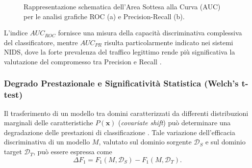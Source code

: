 \begin{figure}[H]
    \caption{Rappresentazione schematica dell'Area Sottesa alla Curva (AUC) per le analisi grafiche ROC (a) e Precision-Recall (b).}
    \label{fig:curve_roc_pr}
\end{figure}

L'indice $AUC_{ROC}$ fornisce una misura della capacità discriminativa complessiva del classificatore, mentre $AUC_{PR}$ risulta particolarmente indicato nei sistemi NIDS, dove la forte prevalenza del traffico legittimo rende più significativa la valutazione del compromesso tra Precision e Recall \cite{saito2015}.

\subsubsection{Degrado Prestazionale e Significatività Statistica (Welch's t-test)}
\label{subsubsec:significativita_statistica}

Il trasferimento di un modello tra domini caratterizzati da differenti distribuzioni marginali delle caratteristiche $P(\mathbf{x})$ (\textit{covariate shift}) può determinare una degradazione delle prestazioni di classificazione \cite{pan2010}. Tale variazione dell'efficacia discriminativa di un modello $M$, valutato sul dominio sorgente $\mathcal{D}_S$ e sul dominio target $\mathcal{D}_T$, può essere espressa come
\begin{equation}
    \Delta F_1=F_1(M,\mathcal{D}_S)-F_1(M,\mathcal{D}_T).
\end{equation}

